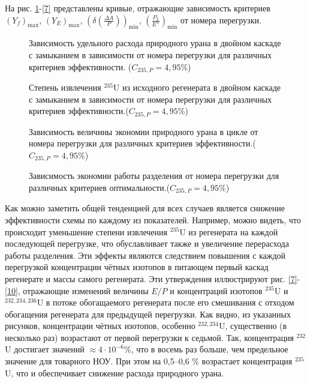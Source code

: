На рис. \ref{4}-\ref{7} представлены кривые, отражающие зависимость критериев $(Y_f)_\text{max}$, $(Y_{E})_\text{max}$, $(\delta(\frac{\Delta A}{P}))_\text{min}$, $(\frac{P_2}{E''})_\text{min}$ от номера перегрузки.

\begin{figure}[ht]
    \centering
    \begin{minipage}{.5\textwidth}
      \centering
      
      \caption{{Зависимость удельного расхода природного урана в двойном каскаде с замыканием в зависимости от номера перегрузки для различных критериев эффективности. ($C_{235,{P}}=4,95\%$){\label{3}}}}
    \end{minipage}%
    \begin{minipage}{.5\textwidth}
      \centering
      
\caption{{Степень извлечения $^{235}$U из исходного регенерата в двойном каскаде с замыканием в зависимости от номера перегрузки для различных критериев эффективности.($C_{235,{P}}=4,95\%$){\label{4}}}}
\end{minipage}
\end{figure}

\begin{figure}[ht]
    \centering
    \begin{minipage}{.5\textwidth}
      \centering
      
      \caption{{Зависимость величины экономии природного урана в цикле от номера перегрузки для различных критериев эффективности.($C_{235,{P}}=4,95\%$){\label{5}}}}
    \end{minipage}%
    \begin{minipage}{.5\textwidth}
      \centering
      
\caption{{Зависимость экономии работы разделения от номера перегрузки для различных критериев оптимальности.($C_{235,{P}}=4,95\%$){\label{6}}}}
\end{minipage}
\end{figure}

Как можно заметить общей тенденцией для всех случаев является снижение эффективности схемы по каждому из показателей. Например, можно видеть, что происходит уменьшение степени извлечения $^{235}$U из регенерата на каждой последующей перегрузке, что обуславливает также и увеличение перерасхода работы разделения. Эти эффекты являются следствием повышения с каждой перегрузкой концентрации чётных изотопов в питающем первый каскад регенерате и массы самого регенерата. Эти утверждения иллюстрируют рис. \ref{7}-\ref{10}, отражающие изменений величины $E/P$ и концентраций изотопов $^{235}$U и $^{232,234,236}$U в потоке обогащаемого регенерата после его смешивания с отходом обогащения регенерата для предыдущей перегрузки. Как видно, из указанных рисунков, концентрации чётных изотопов, особенно $^{232,234}$U, существенно (в несколько раз) возрастают от первой перегрузки к седьмой. Так, концентрация $^{232}$U достигает значений $\approx 4\cdot10^{-6} \%$, что в восемь раз больше, чем предельное значение для товарного НОУ. При этом на 0,5--0,6 \% возрастает концентрация $^{235}$U, что и обеспечивает снижение расхода природного урана.       

